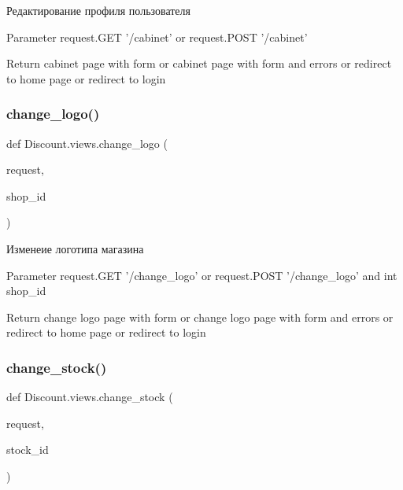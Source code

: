 \begin{DoxyVerb}Редактирование профиля пользователя

Parameter
    request.GET '/cabinet' or request.POST '/cabinet'

Return
    cabinet page with form
    or
    cabinet page with form and errors
    or
    redirect to home page
    or
    redirect to login
\end{DoxyVerb}
 \mbox{\label{namespace_discount_1_1views_a4fa12ffebe567e85364025de7b2d84be}} 
\subsubsection{\texorpdfstring{change\+\_\+logo()}{change\_logo()}}
{\footnotesize\ttfamily def Discount.\+views.\+change\+\_\+logo (\begin{DoxyParamCaption}\item[{}]{request,  }\item[{}]{shop\+\_\+id }\end{DoxyParamCaption})}

\begin{DoxyVerb}Изменеие логотипа магазина

Parameter
    request.GET '/change_logo' or request.POST '/change_logo' and int shop_id

Return
    change logo page with form
    or
    change logo page with form and errors
    or
    redirect to home page
    or
    redirect to login
\end{DoxyVerb}
 \mbox{\label{namespace_discount_1_1views_a418332f381d43cd21532275955de41d9}} 
\subsubsection{\texorpdfstring{change\+\_\+stock()}{change\_stock()}}
{\footnotesize\ttfamily def Discount.\+views.\+change\+\_\+stock (\begin{DoxyParamCaption}\item[{}]{request,  }\item[{}]{stock\+\_\+id }\end{DoxyParamCaption})}

